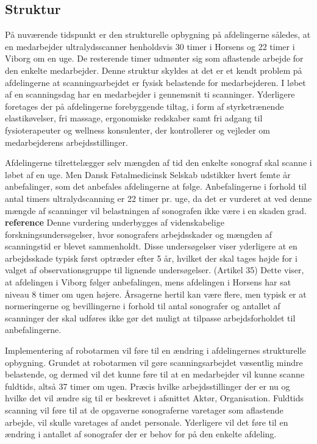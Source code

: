 \subsection{Struktur}
På nuværende tidspunkt er den strukturelle opbygning på afdelingerne således, at en medarbejder ultralydsscanner henholdsvis 30 timer i Horsens og 22 timer i Viborg om en uge. De resterende timer udmønter sig som aflastende arbejde for den enkelte medarbejder. Denne struktur skyldes at det er et kendt problem på afdelingerne at scanningsarbejdet er fysisk belastende for medarbejderen. I løbet af en scanningsdag har en medarbejder i gennemsnit ti scanninger. Yderligere foretages der på afdelingerne forebyggende tiltag, i form af styrketrænende elastikøvelser, fri massage, ergonomiske redskaber samt fri adgang til fysioterapeuter og wellness konsulenter, der kontrollerer og vejleder om medarbejderens arbejdsstillinger.

Afdelingerne tilrettelægger selv mængden af tid den enkelte sonograf skal scanne i løbet af en uge. Men Dansk Føtalmedicinsk Selskab udstikker hvert femte år anbefalinger, som det anbefales afdelingerne at følge. Anbefalingerne i forhold til antal timers ultralydscanning er 22 timer pr. uge, da det er vurderet at ved denne mængde af scanninger vil belastningen af sonografen ikke være i en skaden grad. \textbf{reference} Denne vurdering underbygges af videnskabelige forskningsundersøgelser, hvor sonografers arbejdsskader og mængden af scanningstid er blevet sammenholdt. Disse undersøgelser viser yderligere at en arbejdsskade typisk først optræder efter 5 år, hvilket der skal tages højde for i valget af observationsgruppe til lignende undersøgelser. (Artikel 35)
Dette viser, at afdelingen i Viborg følger anbefalingen, mens afdelingen i Horsens har sat niveau 8 timer om ugen højere. Årsagerne hertil kan være flere, men typisk er at normeringerne og bevillingerne i forhold til antal sonografer og antallet af scanninger der skal udføres ikke gør det muligt at tilpasse arbejdsforholdet til anbefalingerne. 

Implementering af robotarmen vil føre til en ændring i afdelingernes strukturelle opbygning. Grundet at robotarmen vil gøre scanningsarbejdet væsentlig mindre belastende, og dermed vil det kunne føre til at en medarbejder vil kunne scanne fuldtids, altså 37 timer om ugen. Præcis hvilke arbejdsstillinger der er nu og hvilke det vil ændre sig til er beskrevet i afsnittet Aktør, Organisation. Fuldtids scanning vil føre til at de opgaverne sonograferne varetager som aflastende arbejde, vil skulle varetages af andet personale. Yderligere vil det føre til en ændring i antallet af sonografer der er behov for på den enkelte afdeling.

